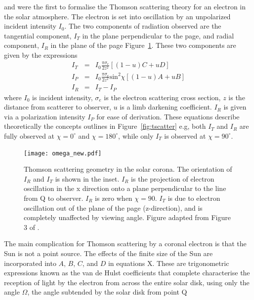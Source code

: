 \citet{schuster1879} and \citet{minnaert1930} were the first to formalise the Thomson scattering theory for an electron in the solar atmosphere. The electron is set into oscillation by an unpolarized  incident intensity $I_0$.
The two components of radiation observed are the tangential component, $I_T$ in the plane perpendicular to the page, and radial component, $I_R$ in the plane of the page Figure~\ref{fig:omega}. 
These two components are given by the expressions
\begin{eqnarray}
I_T &=& I_0\frac{\pi \sigma_e}{2z^2}[(1-u)C +uD] \\
I_P &=& I_0\frac{\pi \sigma_e}{2z^2}\mathrm{sin}^2\chi[(1-u)A +uB] \\
I_R &=& I_T-I_P
\end{eqnarray}
where $I_0$ is incident intensity, $\sigma_e$ is the electron scattering cross section, $z$ is the distance from scatterer to observer, $u$ is a limb darkening coefficient. $I_R$ is given via a polarization intensity $I_P$ for ease of derivation. These equations describe theoretically the concepts outlines in Figure~\ref{fig:tscatter} e.g, both $I_T$ and $I_R$ are fully observed at $\chi=0^{\circ}$ and $\chi=180^{\circ}$, while only $I_T$ is observed at $\chi=90^{\circ}$. 
\begin{figure}[!t]
\begin{center}
\texttt{[image: omega\_new.pdf]}
\caption[Thomson scattering geometry in the solar corona]{Thomson scattering geometry in the solar corona. The orientation of $I_R$ and $I_T$ is shown in the inset. $I_R$ is the projection of electron oscillation in the x direction onto a plane perpendicular to the line from Q to observer. $I_R$ is zero when $\chi=90$. $I_T$ is due to electron oscillation out of the plane of the page (z-direction), and is completely unaffected by viewing angle. Figure adapted from Figure 3 of \citep{howtap2009}.}
\label{fig:omega}
\end{center}
\end{figure}
The main complication for Thomson scattering by a coronal electron is that the Sun is not a point source. The effects of the finite size of the Sun are incorporated into $A$, $B$, $C$, and $D$ in equations X. These are trigonometric expressions known as the van de Hulst coefficients that complete characterise the reception of light by the electron from across the entire solar disk, using only the angle $\Omega$, the angle subtended by the solar disk from point Q \citep{minnaert1930, billings1966, billings1966} 
